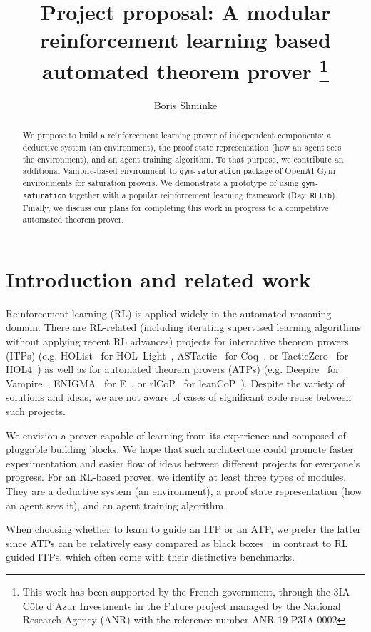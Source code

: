 \documentclass{easychair}
\title{Project proposal: A modular reinforcement learning based automated theorem prover \thanks{This work has been supported by the French government, through the 3IA Côte d'Azur Investments in the Future project managed by the National Research Agency (ANR) with the reference number ANR-19-P3IA-0002}}
\author{Boris Shminke \inst{1}}
\institute{
  Université Côte d'Azur, CNRS, LJAD, France \\
  \email{boris.shminke@univ-cotedazur.fr}
 }
\begin{document}
\maketitle
\begin{abstract}
We propose to build a reinforcement learning prover of independent components: a deductive system (an environment), the proof state representation (how an agent sees the environment), and an agent training algorithm. To that purpose, we contribute an additional Vampire-based environment to \texttt{gym-saturation} package of OpenAI Gym environments for saturation provers. We demonstrate a prototype of using \texttt{gym-saturation} together with a popular reinforcement learning framework (Ray~\texttt{RLlib}). Finally, we discuss our plans for completing this work in progress to a competitive automated theorem prover.
\end{abstract}
\section{Introduction and related work}
Reinforcement learning (RL) is applied widely in the automated reasoning domain. There are RL-related (including iterating supervised learning algorithms without applying recent RL advances) projects for interactive theorem provers (ITPs) (e.g. HOList~\cite{DBLP:conf/icml/BansalLRSW19} for HOL~Light~\cite{10.1007/978-3-642-03359-9_4}, ASTactic~\cite{DBLP:conf/icml/YangD19} for Coq~\cite{the_coq_development_team_2022_5846982}, or TacticZero~\cite{NEURIPS2021_4dea382d} for HOL4~\cite{10.1007/978-3-540-71067-7_6}) as well as for automated theorem provers (ATPs) (e.g. Deepire~\cite{10.1007/978-3-030-79876-5_31} for Vampire~\cite{10.1007/978-3-642-39799-8_1}, ENIGMA~\cite{10.1007/978-3-030-29436-6_29} for E~\cite{10.1007/978-3-319-62075-6_20}, or rlCoP~\cite{NEURIPS2018_55acf853} for leanCoP~\cite{OTTEN2003139}). Despite the variety of solutions and ideas, we are not aware of cases of significant code reuse between such projects.

We envision a prover capable of learning from its experience and composed of pluggable building blocks. We hope that such architecture could promote faster experimentation and easier flow of ideas between different projects for everyone's progress. For an RL-based prover, we identify at least three types of modules. They are a deductive system (an environment), a proof state representation (how an agent sees it), and an agent training algorithm.

When choosing whether to learn to guide an ITP or an ATP, we prefer the latter since ATPs can be relatively easy compared as black boxes~\cite{DBLP:journals/aicom/Sutcliffe21} in contrast to RL guided ITPs, which often come with their distinctive benchmarks.
\end{document}
